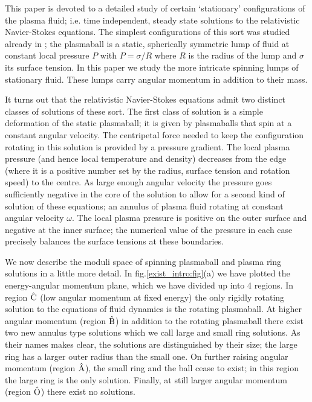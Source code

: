 This paper is devoted to a detailed study of certain `stationary'
configurations of the plasma fluid; i.e. time independent, steady
state solutions to the relativistic Navier-Stokes equations. The
simplest configurations of this sort was studied already in
\cite{Aharony:2005bm}; the plasmaball is a static, spherically
symmetric lump of fluid at constant local pressure $P$ with $P=
\sigma /R$ where $R$ is the radius of the lump and $\sigma$ its
surface tension. In this paper we study the more intricate spinning
lumps of stationary fluid. These lumps carry angular momentum in
addition to their mass.

It turns out that the relativistic Navier-Stokes equations admit two
distinct classes of solutions of these sort. The first class of
solution is a simple deformation of the static plasmaball; it is
given by plasmaballs that spin at a constant angular velocity. The
centripetal force needed to keep the configuration rotating in this
solution is provided by a pressure gradient. The local plasma
pressure (and hence local temperature and density) decreases from
the edge (where it is a positive number set by the radius, surface
tension and rotation speed) to the centre. As large enough angular
velocity the pressure goes sufficiently negative in the core of the
solution to allow for a second kind of solution of these equations;
an annulus of plasma fluid rotating at constant angular velocity
$\omega$. The local plasma pressure is positive on the outer surface
and negative at the inner surface; the numerical value of the
pressure in each case precisely balances the surface tensions at
these boundaries.

We now describe the moduli space of spinning plasmaball and plasma
ring solutions in a little more detail. In
fig.\ref{exist_intro:fig}(a) we have plotted the energy-angular
momentum plane, which we have divided up into 4 regions. In region
$\hat{\mathrm{C}}$ (low angular momentum at fixed energy) the only rigidly
rotating solution to the equations of fluid dynamics is the rotating
plasmaball. At higher angular momentum (region $\hat{\mathrm{B}}$) in addition to
the rotating plasmaball there exist two new annulus type solutions
which we call large and small ring solutions. As their names makes
clear, the solutions are distinguished by their size; the large ring
has a larger outer radius than the small one. On further raising
angular momentum (region $\hat{\mathrm{A}}$), the small ring and the ball cease
to exist; in this region the large ring is the only solution.
Finally, at still larger angular momentum (region $\hat{\mathrm{O}}$) there
exist no solutions.

